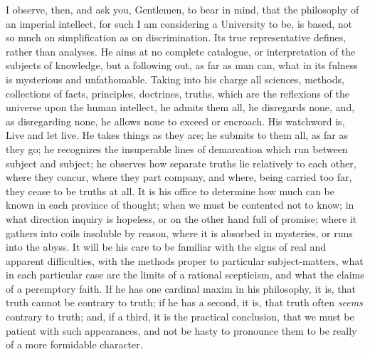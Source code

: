 I observe, then, and ask you, Gentlemen, to bear in mind, that the philosophy of an imperial intellect, for such I am
considering a University to be, is based, not so much on
simplification as on discrimination. Its true representative defines,
rather than analyses. He aims at no complete catalogue, or
interpretation of the subjects of knowledge, but a following out, as
far as man can, what in its fulness is mysterious and unfathomable.
Taking into his charge all sciences, methods, collections of facts,
principles, doctrines, truths, which are the reflexions of the
universe upon the human intellect, he admits them all, he disregards
none, and, as disregarding none, he allows none to exceed or encroach.
His watchword is, Live and let live. He takes things as they are; he
submits to them all, as far as they go; he recognizes the insuperable
lines of demarcation which run between subject and subject; he
observes how separate truths lie relatively to each other, where they
concur, where they part company, and where, being carried too far,
they cease to be truths at all. It is his office to determine how much
can be known in each province of thought; when we must be contented
not to know; in what direction inquiry is hopeless, or on the other
hand full of promise; where it gathers into coils insoluble by reason,
where it is absorbed in mysteries, or runs into the abyss. It will be
his care to be familiar with the signs of real and apparent
difficulties, with the methods proper to particular subject-matters,
what in each particular case are the limits of a rational scepticism,
and what the claims of a peremptory faith. If he has one cardinal
maxim in his philosophy, it is, that truth cannot be contrary to
truth; if he has a second, it is, that truth often \emph{seems}
contrary to truth; and, if a third, it is the practical conclusion,
that we must be patient with such appearances, and not be hasty to
pronounce them to be really of a more formidable character.

